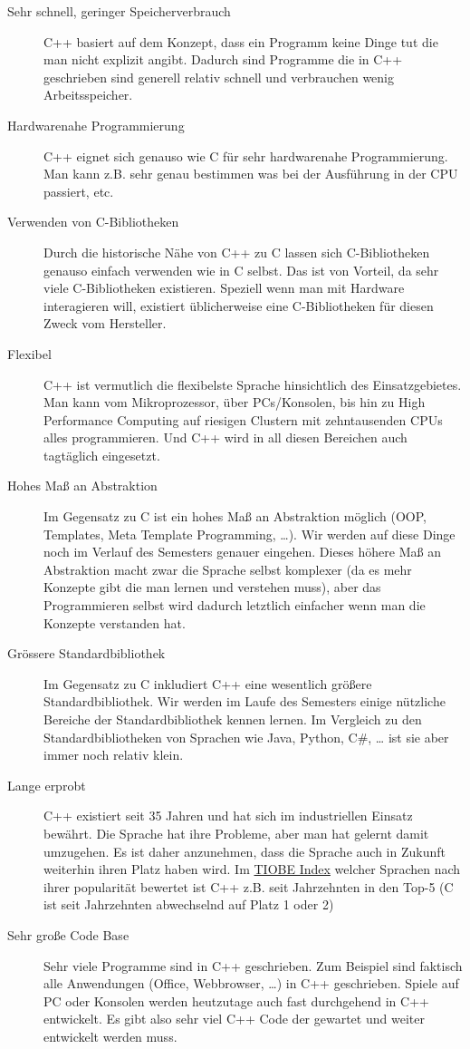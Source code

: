 \documentclass[11pt]{article}
\begin{document}
\begin{description}
\item[{Sehr schnell, geringer Speicherverbrauch}] C++ basiert auf dem
Konzept, dass ein Programm keine Dinge tut die man nicht explizit
angibt. Dadurch sind Programme die in C++ geschrieben sind
generell relativ schnell und verbrauchen wenig Arbeitsspeicher.
\item[{Hardwarenahe Programmierung}] C++ eignet sich genauso wie C für
sehr hardwarenahe Programmierung. Man kann z.B. sehr genau
bestimmen was bei der Ausführung in der CPU passiert, etc.
\item[{Verwenden von C-Bibliotheken}] Durch die historische Nähe von C++
zu C lassen sich C-Bibliotheken genauso einfach verwenden wie in
C selbst. Das ist von Vorteil, da sehr viele C-Bibliotheken
existieren. Speziell wenn man mit Hardware interagieren will,
existiert üblicherweise eine C-Bibliotheken für diesen Zweck vom
Hersteller.
\item[{Flexibel}] C++ ist vermutlich die flexibelste Sprache hinsichtlich
des Einsatzgebietes. Man kann vom Mikroprozessor, über
PCs/Konsolen, bis hin zu High Performance Computing auf riesigen
Clustern mit zehntausenden CPUs alles programmieren. Und C++ wird
in all diesen Bereichen auch tagtäglich eingesetzt.
\item[{Hohes Maß an Abstraktion}] Im Gegensatz zu C ist ein hohes Maß an
Abstraktion möglich (OOP, Templates, Meta Template Programming,
\ldots{}). Wir werden auf diese Dinge noch im Verlauf des Semesters
genauer eingehen. Dieses höhere Maß an Abstraktion macht zwar die
Sprache selbst komplexer (da es mehr Konzepte gibt die man lernen
und verstehen muss), aber das Programmieren selbst wird dadurch
letztlich einfacher wenn man die Konzepte verstanden hat.
\item[{Grössere Standardbibliothek}] Im Gegensatz zu C inkludiert C++ eine
wesentlich größere Standardbibliothek. Wir werden im Laufe des
Semesters einige nützliche Bereiche der Standardbibliothek kennen
lernen. Im Vergleich zu den Standardbibliotheken von Sprachen wie
Java, Python, C\#, \ldots{} ist sie aber immer noch relativ klein.
\item[{Lange erprobt}] C++ existiert seit 35 Jahren und hat sich im
industriellen Einsatz bewährt. Die Sprache hat ihre Probleme,
aber man hat gelernt damit umzugehen. Es ist daher anzunehmen,
dass die Sprache auch in Zukunft weiterhin ihren Platz haben
wird. Im \href{https://www.tiobe.com/tiobe-index/}{TIOBE Index} welcher Sprachen nach ihrer popularität
bewertet ist C++ z.B. seit Jahrzehnten in den Top-5 (C ist seit
Jahrzehnten abwechselnd auf Platz 1 oder 2)
\item[{Sehr große Code Base}] Sehr viele Programme sind in C++
geschrieben. Zum Beispiel sind faktisch alle Anwendungen (Office,
Webbrowser, \ldots{}) in C++ geschrieben. Spiele auf PC oder Konsolen
werden heutzutage auch fast durchgehend in C++ entwickelt. Es
gibt also sehr viel C++ Code der gewartet und weiter entwickelt
werden muss.
\end{description}
\end{document}
